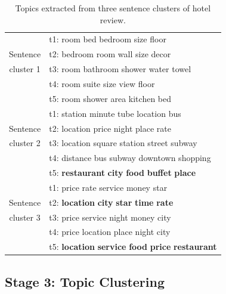 \begin{table}[t]
	\small
	\centering
	\caption{Topics extracted from three sentence clusters of hotel review.}
	\label{table:overlap}
	\begin{tabular}{|c|l|}
		\hline
		& t1: room bed bedroom size floor \\
		Sentence
		&t2:  bedroom room wall size decor \\
		cluster 1
		&t3:  room bathroom shower water towel \\
		&t4:  room suite size view floor \\
		&t5:  room shower area kitchen bed \\\hline
		
		&t1:  station minute tube location bus \\
		Sentence
		&t2:  location price night place rate\\
		cluster 2
		&t3:  location square station street subway\\
		&t4:  distance bus subway downtown shopping\\
		&t5:  \textbf{restaurant} \textbf{city} \textbf{food} \textbf{buffet} \textbf{place} \\\hline
		
		&t1:  price rate service money star\\
		Sentence
		&t2:  \textbf{location} \textbf{city} \textbf{star} \textbf{time} \textbf{rate} \\
		cluster 3
		&t3:  price service night money city\\
		&t4:  price location place night city\\
		&t5:  \textbf{location} \textbf{service} \textbf{food} \textbf{price} \textbf{restaurant} \\\hline
	\end{tabular}
\end{table}


\subsection{Stage 3: Topic Clustering}
\label{sec:topic_clustering}

